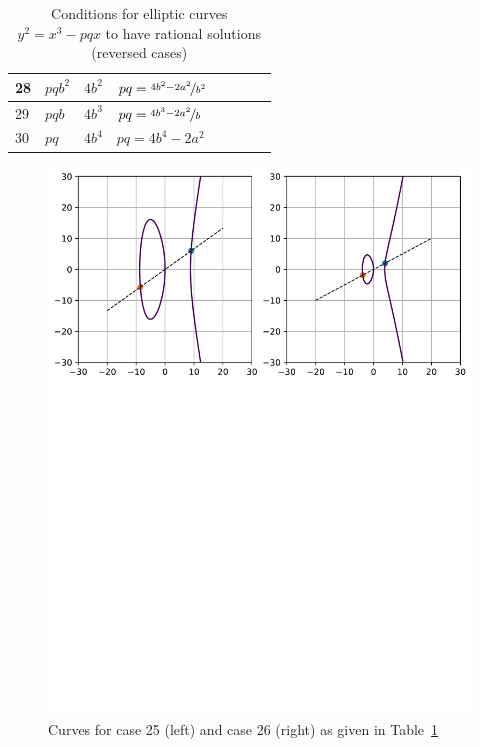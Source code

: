 \documentclass[12pt]{amsart}
\theoremstyle{definition}
\begin{document}
{\begin{table}[H]
\begin{tabular}{|l|l|l|l|l|l|l|l|}
				\\
				\hline
				28 &
				$pqb^2$ &
				$4b^2$ &
				$pq=\nicefrac{4b^2-2a^2}{b^2}$ &
				&
				&
				&
				
				\\
				\hline
				29 &
				$pqb$ &
				$4b^3$ &
				$pq=\nicefrac{4b^3-2a^2}{b}$ &
				&
				&
				&
				
				\\
				\hline
				30 &
				$pq$ &
				$4b^4$ &
				$pq=4b^4-2a^2$ &
				&
				&
				&
				
				\\
				\hline
			\end{tabular}
			\caption{Conditions for elliptic curves $y^2=x^3-pqx$ to have rational solutions (reversed cases)}
			\label{table:cases_inv}
	\end{table}}
	
	\begin{figure}[H]
		\includegraphics[clip, trim=0cm 17.3cm 0cm 0cm, width=1.00\textwidth, page=1]{figures/curves.pdf}
		\caption{Curves for case 25 (left) and case 26 (right) as given in Table~\ref{table:cases_inv}}
		\label{fig:curves}
	\end{figure}
	
\end{document}
